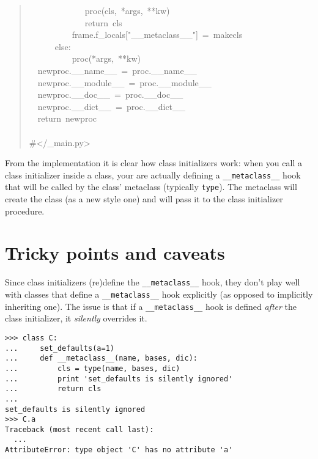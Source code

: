 \documentclass[10pt,a4paper,english]{article}
\begin{document}
\begin{quote}
{~~~~~~~~~~~~~proc(cls,~*args,~**kw)~\\
~~~~~~~~~~~~~return~cls~\\
~~~~~~~~~~frame.f{\_}locals{[}"{\_}{\_}metaclass{\_}{\_}"{]}~=~makecls~\\
~~~~~~else:~\\
~~~~~~~~~~proc(*args,~**kw)~\\
~~newproc.{\_}{\_}name{\_}{\_}~=~proc.{\_}{\_}name{\_}{\_}~\\
~~newproc.{\_}{\_}module{\_}{\_}~=~proc.{\_}{\_}module{\_}{\_}~\\
~~newproc.{\_}{\_}doc{\_}{\_}~=~proc.{\_}{\_}doc{\_}{\_}~\\
~~newproc.{\_}{\_}dict{\_}{\_}~=~proc.{\_}{\_}dict{\_}{\_}~\\
~~return~newproc~\\
~\\
{\#}</{\_}main.py>
}\end{quote}

From the implementation it is clear how class initializers work:
when you call a class initializer inside a class, your are actually defining a
\texttt{{\_}{\_}metaclass{\_}{\_}} hook that will be called by
the class' metaclass (typically \texttt{type}). The
metaclass will create the class (as a new style one) and
will pass it to the class initializer procedure.



\hypertarget{tricky-points-and-caveats}{}
\section*{Tricky points and caveats}

Since class initializers (re)define the \texttt{{\_}{\_}metaclass{\_}{\_}} hook,
they don't play well with classes that define a \texttt{{\_}{\_}metaclass{\_}{\_}} hook
explicitly (as opposed to implicitly inheriting one). The issue is
that if a \texttt{{\_}{\_}metaclass{\_}{\_}} hook is defined \emph{after} the
class initializer, it \emph{silently} overrides it.
\begin{verbatim}>>> class C:
...     set_defaults(a=1)
...     def __metaclass__(name, bases, dic):
...         cls = type(name, bases, dic)
...         print 'set_defaults is silently ignored'
...         return cls
...
set_defaults is silently ignored
>>> C.a
Traceback (most recent call last):
  ...
AttributeError: type object 'C' has no attribute 'a'\end{verbatim}
\end{document}

